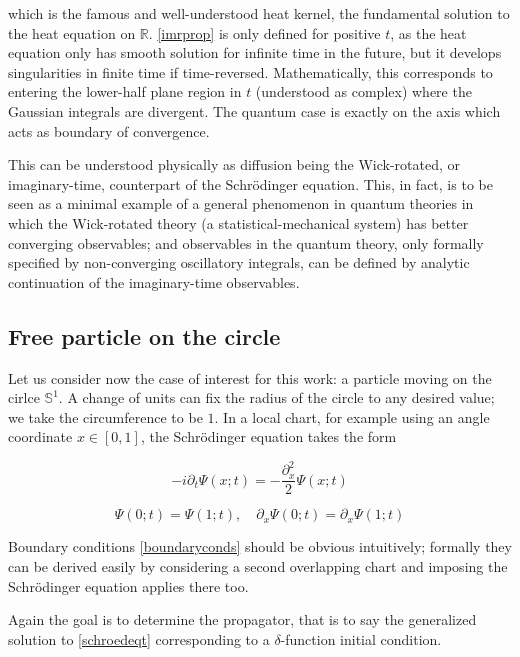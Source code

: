 \documentclass{article}
\newcommand{\ess}{\ensuremath{\mathbb{S}}}
\newcommand{\ar}{\ensuremath{\mathbb{R}}}
\begin{document}
which is the famous and well-understood heat kernel, the fundamental solution to the heat equation on $\ar$. \eqref{imrprop} is only defined for positive $t$, as the heat equation only has smooth solution for infinite time in the future, but it develops singularities in finite time if time-reversed. Mathematically, this corresponds to entering the lower-half plane region in $t$ (understood as complex) where the Gaussian integrals are divergent. The quantum case is exactly on the axis which acts as boundary of convergence.

This can be understood physically as diffusion being the Wick-rotated, or imaginary-time, counterpart of the Schr\"odinger equation. This, in fact, is to be seen as a minimal example of a general phenomenon in quantum theories in which the Wick-rotated theory (a statistical-mechanical system) has better converging observables; and observables in the quantum theory, only formally specified by non-converging oscillatory integrals, can be defined by analytic continuation of the imaginary-time observables.



\subsection{Free particle on the circle}

Let us consider now the case of interest for this work: a particle moving on the cirlce $\ess^1$. A change of units can fix the radius of the circle to any desired value; we take the circumference to be $1$. In a local chart, for example using an angle coordinate $x \in [0,1]$, the Schr\"odinger equation takes the form

\begin{equation}
    \label{schroedeqt}
    -i\partial_t \Psi(x;t) = - \frac{\partial_x^2}{2} \Psi(x;t)
\end{equation}

\begin{equation}    
    \label{boundaryconds}
    \Psi(0;t) = \Psi(1;t), \quad \partial_x \Psi(0;t) = \partial_x \Psi(1;t)
\end{equation}

Boundary conditions \eqref{boundaryconds} should be obvious intuitively; formally they can be derived easily by considering a second overlapping chart and imposing the Schr\"odinger equation applies there too.

Again the goal is to determine the propagator, that is to say the generalized solution to \eqref{schroedeqt} corresponding to a $\delta$-function initial condition.
\end{document}
